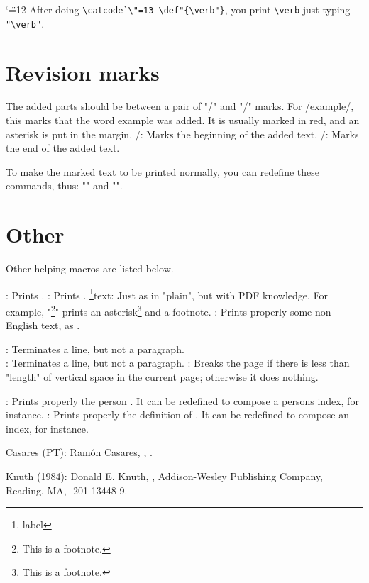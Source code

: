 {\catcode`\"=12
After doing \verb|\catcode`\"=13 \def"{\verb"}|,
you print \verb|\verb| just typing \verb|"\verb"|.}\par



\section{Revision marks}

The added parts should be between a pair of "\new/" and "\wen/" marks.
For \new/example\wen/, this marks that the word example was added.
It is usually marked in red, and an asterisk is put in the margin.
\command\new/: Marks the beginning of the added text.
\command\wen/: Marks the end of the added text.

To make the marked text to be printed normally,
you can redefine these commands, thus:
"\def\new/{\relax}" and "\def\wen/{\relax}".


\section{Other}

Other helping macros are listed below.

\command\todayiso: Prints \todayiso.
\command\QED: Prints \QED.
\command\footnote{label}{text}: Just as in "plain",
 but with PDF knowledge.
 For example, "\footnote*{This is a footnote.}" prints
 an asterisk\footnote*{This is a footnote.} and a footnote.
\command{}: Prints properly some
 non-English text, as .

\command\newline: Terminates a line, but not a paragraph.
\command\\: Terminates a line, but not a paragraph.
\command{}: Breaks the page if there is
 less than "length" of vertical space in the current page;
 otherwise it does nothing.

\command{}: Prints properly the person .
 It can be redefined to compose a persons index, for instance.
\command{}: Prints properly
 the definition of .
 It can be redefined to compose an index, for instance.



\biblabel Casares (PT):
Ramón Casares,
,
.

\biblabel Knuth (1984):
Donald E. Knuth,
,
Addison-Wesley Publishing Company, Reading, MA,
-201-13448-9.





\bye
